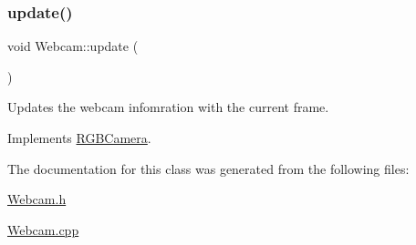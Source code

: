 \subsubsection{\texorpdfstring{update()}{update()}}
{\footnotesize\ttfamily void Webcam\+::update (\begin{DoxyParamCaption}{ }\end{DoxyParamCaption})\hspace{0.3cm}{\ttfamily [virtual]}}



Updates the webcam infomration with the current frame. 



Implements \hyperlink{class_r_g_b_camera_ac9fa3f8f32605e846827b694ae7cff18}{R\+G\+B\+Camera}.



The documentation for this class was generated from the following files\+:\begin{DoxyCompactItemize}
\item 
\hyperlink{_webcam_8h}{Webcam.\+h}\item 
\hyperlink{_webcam_8cpp}{Webcam.\+cpp}\end{DoxyCompactItemize}
